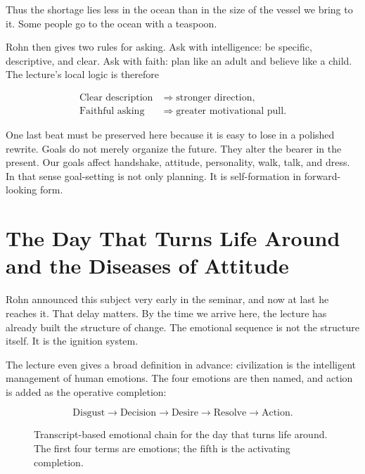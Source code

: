 Thus the shortage lies less in the ocean than in the size of the vessel we bring to it. Some people go to the ocean with a teaspoon.

Rohn then gives two rules for asking. Ask with intelligence: be specific, descriptive, and clear. Ask with faith: plan like an adult and believe like a child. The lecture's local logic is therefore

\begin{align}
\text{Clear description} &\Longrightarrow \text{stronger direction},\\
\text{Faithful asking} &\Longrightarrow \text{greater motivational pull}.
\end{align}

One last beat must be preserved here because it is easy to lose in a polished rewrite. Goals do not merely organize the future. They alter the bearer in the present. Our goals affect handshake, attitude, personality, walk, talk, and dress. In that sense goal-setting is not only planning. It is self-formation in forward-looking form.

\section{The Day That Turns Life Around and the Diseases of Attitude}

Rohn announced this subject very early in the seminar, and now at last he reaches it. That delay matters. By the time we arrive here, the lecture has already built the structure of change. The emotional sequence is not the structure itself. It is the ignition system.

The lecture even gives a broad definition in advance: civilization is the intelligent management of human emotions. The four emotions are then named, and action is added as the operative completion:

\begin{equation}
\text{Disgust} \to \text{Decision} \to \text{Desire} \to \text{Resolve} \to \text{Action}.
\end{equation}

\begin{figure}[t]
\centering
{}
\caption{Transcript-based emotional chain for the day that turns life around. The first four terms are emotions; the fifth is the activating completion.}
\end{figure}

